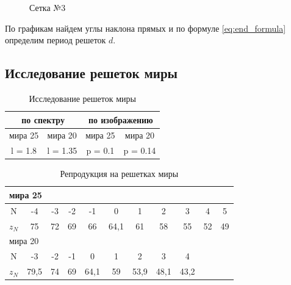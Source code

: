\documentclass[a4paper, 12pt]{article}
\begin{document}
\begin{figure}[h!]
\begin{center}
\begin{minipage}{0.49\textwidth}
				\caption{Сетка №3}
			\end{minipage}
		\end{center}
	\end{figure}		
	
	По графикам найдем углы наклона прямых и по формуле \eqref{eq:end_formula} определим период решеток $d$.
	
	\subsection{Исследование решеток миры}
	
	\begin{table}[h!]\label{tab:miras}
		\centering
		\caption{Исследование решеток миры}
		\begin{tabular}{|c|c|c|c|}
			\hline
			\multicolumn{2}{|c|}{по спектру} & \multicolumn{2}{c|}{по изображению} \\ \hline
			мира 25        & мира 20         & мира 25          & мира 20          \\ \hline
			l = 1.8        & l = 1.35        & p = 0.1          & p = 0.14         \\ \hline
		\end{tabular}
	\end{table}
	
	\begin{table}[h!]\label{tab:repr_miras}
		\centering
		\caption{Репродукция на решетках миры}
		\begin{tabular}{|c|c|c|c|c|c|c|c|c|c|c|}
			\hline
			\multicolumn{11}{|l|}{мира 25}                                                                    \\ \hline
			N    & -4   & -3 & -2 & -1   & 0    & 1    & 2    & 3    & 4                  & 5                 \\ \hline
			$z_N$ & 75   & 72 & 69 & 66   & 64,1 & 61   & 58   & 55   & 52                 & 49                \\ \hline
			\multicolumn{11}{|l|}{мира 20}                                                                    \\ \hline
			N    & -3   & -2 & -1 & 0    & 1    & 2    & 3    & 4    & \multicolumn{2}{c|}{\multirow{2}{*}{}} \\ \cline{1-9}
			$z_N$ & 79,5 & 74 & 69 & 64,1 & 59   & 53,9 & 48,1 & 43,2 & \multicolumn{2}{c|}{}                  \\ \hline
		\end{tabular}
	\end{table}
\end{document}
